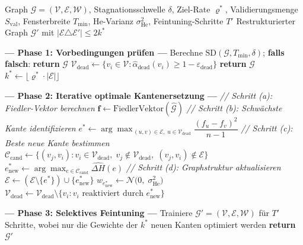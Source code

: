 \documentclass[12pt, a4paper, openany]{report}
\newcommand{\calG}{\mathcal{G}}
\newcommand{\calN}{\mathcal{N}}
\newcommand{\calV}{\mathcal{V}}
\newcommand{\calE}{\mathcal{E}}
\newcommand{\calW}{\mathcal{W}}
\newcommand{\calC}{\mathcal{C}}
\newcommand{\eps}{\varepsilon}
\begin{document}
\begin{algorithm}[H]
\caption{Optimale minimale Graphrestrukturierung (OMGR)}
\label{alg:omgr}
\begin{algorithmic}[1]
\Require Graph $\calG = (\calV, \calE, \calW)$, Stagnationsschwelle $\delta$,
         Ziel-Rate $\varrho^*$, Validierungsmenge $S_{\mathrm{val}}$,
         Fensterbreite $T_{\min}$, He-Varianz $\sigma^2_{\mathrm{He}}$,
         Feintuning-Schritte $T'$
\Ensure Restrukturierter Graph $\calG'$ mit
        $|\calE \triangle \calE'| \leq 2k^*$

\Statex \textbf{--- Phase 1: Vorbedingungen prüfen ---}
\State Berechne $\mathrm{SD}(\calG, T_{\min}, \delta)$;
       \textbf{falls falsch}: \textbf{return} $\calG$ 
\State $\calV_{\mathrm{dead}} \leftarrow
       \{v_i \in \calV : \hat{\alpha}_{\mathrm{dead}}(v_i) \geq 1 - \eps_{\mathrm{dead}}\}$
\If{$\calV_{\mathrm{dead}} = \emptyset$}
  \State \textbf{return} $\calG$
\EndIf
\State $k^* \leftarrow \lfloor \varrho^* \cdot |\calE| \rfloor$

\Statex \textbf{--- Phase 2: Iterative optimale Kantenersetzung ---}
  \State \textit{// Schritt (a): Fiedler-Vektor berechnen}
  \State $\bm{f} \leftarrow \mathrm{FiedlerVektor}(\hat{\calG})$
  \State \textit{// Schritt (b): Schwächste Kante identifizieren}
  \State $e^* \leftarrow \arg\max_{\,(u,v) \in \calE,\; u \in \calV_{\mathrm{dead}}}
         \dfrac{(f_u - f_v)^2}{n - 1}$
  \State \textit{// Schritt (c): Beste neue Kante bestimmen}
  \State $\calC_{\mathrm{cand}} \leftarrow
         \{(v_j, v_i) : v_i \in \calV_{\mathrm{dead}},\; v_j \notin \calV_{\mathrm{dead}},\;
           (v_j, v_i) \notin \calE\}$
  \State $e_{\mathrm{new}}^* \leftarrow \arg\max_{e \in \calC_{\mathrm{cand}}}
         \widehat{\Delta H}(e)$
  \State \textit{// Schritt (d): Graphstruktur aktualisieren}
  \State $\calE \leftarrow (\calE \setminus \{e^*\}) \cup \{e_{\mathrm{new}}^*\}$
  \State $w_{e_{\mathrm{new}}^*} \leftarrow \calN\!\bigl(0,\; \sigma^2_{\mathrm{He}}\bigr)$
  \State $\calV_{\mathrm{dead}} \leftarrow
         \calV_{\mathrm{dead}} \setminus \{v_i : v_i \text{ reaktiviert durch } e_{\mathrm{new}}^*\}$
\EndFor

\Statex \textbf{--- Phase 3: Selektives Feintuning ---}
\State Trainiere $\calG' = (\calV, \calE, \calW)$ für $T'$ Schritte,
       wobei nur die Gewichte der $k^*$ neuen Kanten optimiert werden
\State \textbf{return} $\calG'$
\end{algorithmic}
\end{algorithm}
\end{document}
